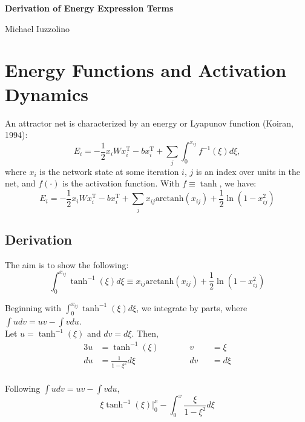 \documentclass[11pt,letterpaper]{article}
\newcommand{\T}{{\ensuremath{\mathrm{T}}}}
\newcommand{\arctanh}{{\ensuremath{\mathrm{arctanh}}}}
\theoremstyle{definition}
\begin{document}
\begin{center}

{\Large \textbf{Derivation of Energy Expression Terms}}

\vspace{1em}
Michael Iuzzolino

\end{center}

\section{Energy Functions and Activation Dynamics}
An attractor net is characterized by an energy or Lyapunov function (Koiran, 1994):
\begin{equation}
E_i = -\frac{1}{2}x_i W x_i^{\T} - bx_i^{\T} + \sum_j \int_0^{x_{ij}} f^{-1}(\xi) d \xi,
\end{equation}
where $x_i$ is the network state at some iteration $i$, $j$ is an index over units in the net, and $f(\cdot)$ is the activation function. With $f \equiv \tanh$, we have:
\begin{equation}
E_i = -\frac{1}{2}x_i W x_i^{\T} - bx_i^{\T} + \sum_j x_{ij} \arctanh(x_{ij}) + \frac{1}{2} \ln(1 - x_{ij}^2)
\end{equation}

\subsection{Derivation}
The aim is to show the following:
\[
\int_0^{x_{ij}} \tanh^{-1}(\xi) d \xi \equiv  x_{ij}\arctanh(x_{ij}) + \frac{1}{2} \ln(1 - x_{ij}^2)
\]

Beginning with $\int_0^{x_{ij}} \tanh^{-1}(\xi) d \xi$, we integrate by parts, where $\int u dv = uv - \int v du$.\\

Let $u = \tanh^{-1}(\xi)$ and $dv = d \xi$. Then,
\begin{alignat*}{3}
u &= \tanh^{-1}(\xi) \qquad && v &&= \xi \\
du &= \frac{1}{1 - \xi^2} d \xi \qquad && dv &&= d\xi\\
\end{alignat*}

Following $\int u dv = uv - \int v du$,
\begin{equation}
\xi \tanh^{-1}(\xi) \bigg\rvert_0^x - \int_0^x \frac{\xi}{1-\xi^2}d \xi
\label{eq:byparts}
\end{equation}
\end{document}
